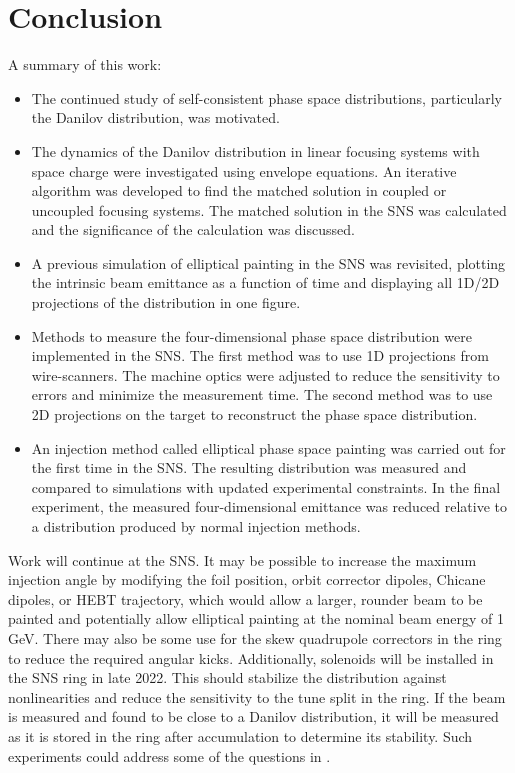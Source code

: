 \chapter{Conclusion} \label{chap-6}

A summary of this work:
%
\begin{itemize}
    \item The continued study of self-consistent phase space distributions, particularly the Danilov distribution, was motivated.
    \item The dynamics of the Danilov distribution in linear focusing systems with space charge were investigated using envelope equations. An iterative algorithm was developed to find the matched solution in coupled or uncoupled focusing systems. The matched solution in the SNS was calculated and the significance of the calculation was discussed.
    \item A previous simulation of elliptical painting in the SNS was revisited, plotting the intrinsic beam emittance as a function of time and displaying all 1D/2D projections of the distribution in one figure.
    \item Methods to measure the four-dimensional phase space distribution were implemented in the SNS. The first method was to use 1D projections from wire-scanners. The machine optics were adjusted to reduce the sensitivity to errors and minimize the measurement time. The second method was to use 2D projections on the target to reconstruct the phase space distribution. 
    \item An injection method called elliptical phase space painting was carried out for the first time in the SNS. The resulting distribution was measured and compared to simulations with updated experimental constraints. In the final experiment, the measured four-dimensional emittance was reduced relative to a distribution produced by normal injection methods.
\end{itemize}
%

Work will continue at the SNS. It may be possible to increase the maximum injection angle by modifying the foil position, orbit corrector dipoles, Chicane dipoles, or HEBT trajectory, which would allow a larger, rounder beam to be painted and potentially allow elliptical painting at the nominal beam energy of 1 GeV. There may also be some use for the skew quadrupole correctors in the ring to reduce the required angular kicks. Additionally, solenoids will be installed in the SNS ring in late 2022. This should stabilize the distribution against nonlinearities and reduce the sensitivity to the tune split in the ring. If the beam is measured and found to be close to a Danilov distribution, it will be measured as it is stored in the ring after accumulation to determine its stability. Such experiments could address some of the questions in \cite{Burov2013}.

